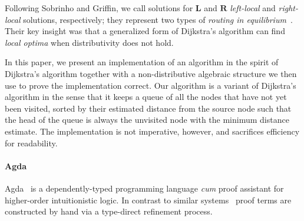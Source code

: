 
Following Sobrinho and Griffin, we call solutions for \(\mathbf{L}\) and \(\mathbf{R}\) \emph{left-local} and \emph{right-local} solutions, respectively; they represent two types of \emph{routing in equilibrium}~\cite{sobrinho_routing_2010}. Their key insight was that a generalized form of Dijkstra's algorithm can find \emph{local optima} when distributivity does not hold.

In this paper, we present an implementation of an algorithm in the spirit of Dijkstra's algorithm together with a non-distributive algebraic structure we then use to prove the implementation correct. Our algorithm is a variant of Dijkstra's algorithm in the sense that it keeps a queue of all the nodes that have not yet been visited, sorted by their estimated distance from the source node such that the head of the queue is always the unvisited node with the minimum distance estimate. The implementation is not imperative, however, and sacrifices efficiency for readability.

\paragraph{Agda}

Agda~\cite{norell_dependently_2009} is a dependently-typed programming language \emph{cum} proof assistant for higher-order intuitionistic logic.
In contrast to similar systems~\cite{bertot_short_2008,asperti_matita_2011} proof terms are constructed by hand via a type-direct refinement process.

